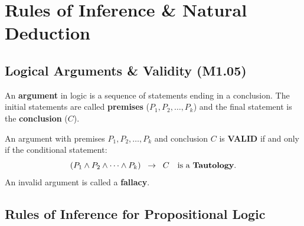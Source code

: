 \documentclass[11pt,a4paper]{article}
\begin{document}
\section{Rules of Inference \& Natural Deduction}

\subsection{Logical Arguments \& Validity (M1.05)}

An \textbf{argument} in logic is a sequence of statements ending in a conclusion. The initial statements are called \textbf{premises} ($P_1, P_2, \dots, P_k$) and the final statement is the \textbf{conclusion} ($C$).

\begin{definition}
An argument with premises $P_1, P_2, \dots, P_k$ and conclusion $C$ is \textbf{VALID} if and only if the conditional statement:
$$(P_1 \land P_2 \land \dots \land P_k) \;\;\rightarrow\;\; C \quad \text{is a \textbf{Tautology}}.$$
An invalid argument is called a \textbf{fallacy}.
\end{definition}

\subsection{Rules of Inference for Propositional Logic}
\end{document}
